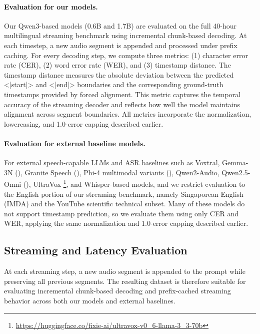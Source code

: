 \documentclass{article}
\begin{document}
\paragraph{Evaluation for our models.}
Our Qwen3-based models (0.6B and 1.7B) are evaluated on the full 40-hour multilingual 
streaming benchmark using incremental chunk-based decoding. At each timestep, a new audio 
segment is appended and processed under prefix caching. For every decoding step, we compute 
three metrics: (1) character error rate (CER), (2) word error rate (WER), and 
(3) timestamp distance. The timestamp distance measures the absolute deviation between the 
predicted <|start|> and <|end|> boundaries and the corresponding ground-truth timestamps 
provided by forced alignment. This metric captures the temporal accuracy of the streaming 
decoder and reflects how well the model maintains alignment across segment boundaries. All 
metrics incorporate the normalization, lowercasing, and 1.0-error capping described earlier.

\paragraph{Evaluation for external baseline models.}
For external speech-capable LLMs and ASR baselines such as Voxtral, Gemma-3N (\citet{gemmateam2025gemma3technicalreport}), Granite Speech (\citet{saon2025granitespeechopensourcespeechawarellms}), 
Phi-4 multimodal variants (\citet{microsoft2025phi4minitechnicalreportcompact}), Qwen2-Audio, Qwen2.5-Omni (\citet{xu2025qwen25omnitechnicalreport}), UltraVox \footnote{ \url{https://huggingface.co/fixie-ai/ultravox-v0_6-llama-3_3-70b}}, and Whisper-based 
models, and we restrict evaluation to the English portion of our streaming benchmark, namely 
Singaporean English (IMDA) and the YouTube scientific technical subset. Many of these models 
do not support timestamp prediction, so we evaluate them using only CER and WER, applying the 
same normalization and 1.0-error capping described earlier.

\subsection{Streaming and Latency Evaluation}

At each streaming step, a new audio segment is appended to the prompt while preserving all 
previous segments. The resulting dataset is therefore suitable for evaluating incremental 
chunk-based decoding and prefix-cached streaming behavior across both our models and 
external baselines.
\end{document}
